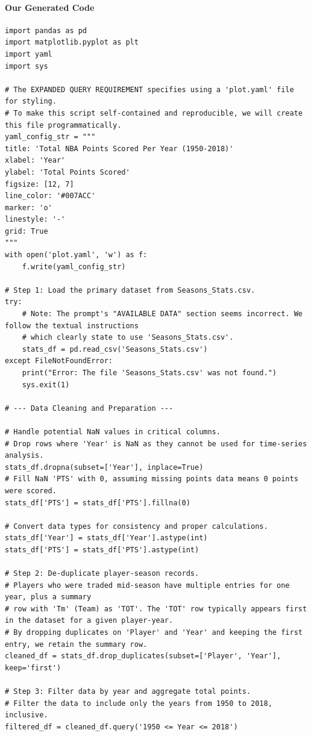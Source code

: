 \documentclass[11pt, a4paper, logo, copyright]{googlecloud}
\begin{document}
\paragraph{Our Generated Code}
\begin{verbatim}
import pandas as pd
import matplotlib.pyplot as plt
import yaml
import sys

# The EXPANDED QUERY REQUIREMENT specifies using a 'plot.yaml' file for styling.
# To make this script self-contained and reproducible, we will create this file programmatically.
yaml_config_str = """
title: 'Total NBA Points Scored Per Year (1950-2018)'
xlabel: 'Year'
ylabel: 'Total Points Scored'
figsize: [12, 7]
line_color: '#007ACC'
marker: 'o'
linestyle: '-'
grid: True
"""
with open('plot.yaml', 'w') as f:
    f.write(yaml_config_str)

# Step 1: Load the primary dataset from Seasons_Stats.csv.
try:
    # Note: The prompt's "AVAILABLE DATA" section seems incorrect. We follow the textual instructions
    # which clearly state to use 'Seasons_Stats.csv'.
    stats_df = pd.read_csv('Seasons_Stats.csv')
except FileNotFoundError:
    print("Error: The file 'Seasons_Stats.csv' was not found.")
    sys.exit(1)

# --- Data Cleaning and Preparation ---

# Handle potential NaN values in critical columns.
# Drop rows where 'Year' is NaN as they cannot be used for time-series analysis.
stats_df.dropna(subset=['Year'], inplace=True)
# Fill NaN 'PTS' with 0, assuming missing points data means 0 points were scored.
stats_df['PTS'] = stats_df['PTS'].fillna(0)

# Convert data types for consistency and proper calculations.
stats_df['Year'] = stats_df['Year'].astype(int)
stats_df['PTS'] = stats_df['PTS'].astype(int)

# Step 2: De-duplicate player-season records.
# Players who were traded mid-season have multiple entries for one year, plus a summary
# row with 'Tm' (Team) as 'TOT'. The 'TOT' row typically appears first in the dataset for a given player-year.
# By dropping duplicates on 'Player' and 'Year' and keeping the first entry, we retain the summary row.
cleaned_df = stats_df.drop_duplicates(subset=['Player', 'Year'], keep='first')

# Step 3: Filter data by year and aggregate total points.
# Filter the data to include only the years from 1950 to 2018, inclusive.
filtered_df = cleaned_df.query('1950 <= Year <= 2018')


\end{verbatim}
\end{document}
